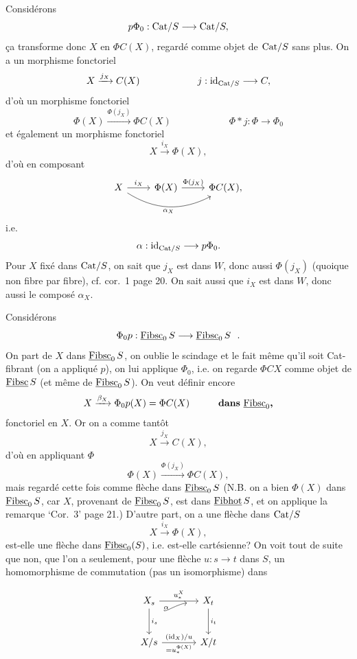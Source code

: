 Considérons
\[ p\Phi_0 : \mathrm{Cat}/S \longrightarrow \mathrm{Cat}/S, \]
ça transforme donc $X$ en $\Phi C(X)$, regardé comme objet de $\mathrm{Cat}/S$ sans plus. On a un morphisme fonctoriel
\[ X \xrightarrow{j_X} C(X) \qquad\qquad\qquad j : \mathrm{id}_{\mathrm{Cat}/S} \longrightarrow C, \]
d'où un morphisme fonctoriel
\[ \Phi(X) \xrightarrow{\Phi(j_X)} \Phi C(X) \qquad\qquad\qquad \Phi * j : \Phi \longrightarrow \Phi_0 \]
et également un morphisme fonctoriel
\[ X \xrightarrow{i_X} \Phi(X), \]
d'où en composant
\[
\begin{tikzcd}
X \arrow[r, "i_X"] \arrow[rr, bend right, "\alpha_X"'] & \Phi(X) \arrow[r, "\Phi(j_X)"] & \Phi C(X),
\end{tikzcd}
\]
i.e.
\[ \alpha : \mathrm{id}_{\mathrm{Cat}/S} \longrightarrow p\Phi_0. \]
Pour $X$ fixé dans $\mathrm{Cat}/S$, on sait que $j_X$ est dans $W$, donc aussi $\Phi(j_X)$ (quoique non fibre par fibre), cf. cor.~1 page 20. On sait aussi que $i_X$ est dans $W$, donc aussi le composé $\alpha_X$.

Considérons
\[ \Phi_0 p : \underline{\mathrm{Fibsc}}_0\,S \longrightarrow \underline{\mathrm{Fibsc}}_0\,S\ \ . \]
On part de $X$ dans $\underline{\mathrm{Fibsc}}_0\,S$, on oublie le scindage et le fait même qu'il soit Cat-fibrant
(on a appliqué $p$), on lui applique $\Phi_0$, i.e. on regarde $\Phi CX$ comme objet de $\underline{\mathrm{Fibsc}}\,S$ (et même de $\underline{\mathrm{Fibsc}}_0\,S$). On veut définir encore
\[ X \xrightarrow{\beta_X} \Phi_0 p(X) = \Phi C(X) \qquad\quad \text{\textbf{dans} } \underline{\mathrm{Fibsc}}_0\text{\textbf{,}} \] %
fonctoriel en $X$. Or on a comme tantôt
\[ X \xrightarrow{j_X} C(X), \]
d'où en appliquant $\Phi$
\[ \Phi(X) \xrightarrow{\Phi(j_X)} \Phi C(X), \]
mais regardé cette fois comme flèche dans $\underline{\mathrm{Fibsc}}_0\,S$ (N.B. on a bien $\Phi(X)$ dans $\underline{\mathrm{Fibsc}}_0\,S$, car $X$, provenant de $\underline{\mathrm{Fibsc}}_0\,S$, est dans $\underline{\mathrm{Fibhot}}\,S$, et on applique la remarque `Cor.~3' page 21.) D'autre part, on a une flèche dans $\mathrm{Cat}/S$
\[ X \xrightarrow{i_X} \Phi(X), \]
est-elle une flèche dans $\underline{\mathrm{Fibsc}}_0(S)$, i.e. est-elle cartésienne? On voit tout de suite que non, que l'on a seulement, pour une flèche $u : s \longrightarrow t$ dans $S$, un homomorphisme de commutation (pas un isomorphisme) dans


\[
\begin{tikzcd}[row sep=large, column sep=large]
X_s \arrow[r, "u_*^X"] \arrow[d, "i_s"] & X_t \arrow[d, "i_t"] \\
X/s \arrow[r, "(\mathrm{id}_X)/u", "= u_*^{\Phi(X)}"'] \arrow[ur, bend left=30, shorten <=28pt, shorten >=12pt, "\alpha"] & X/t
\end{tikzcd}
\]

